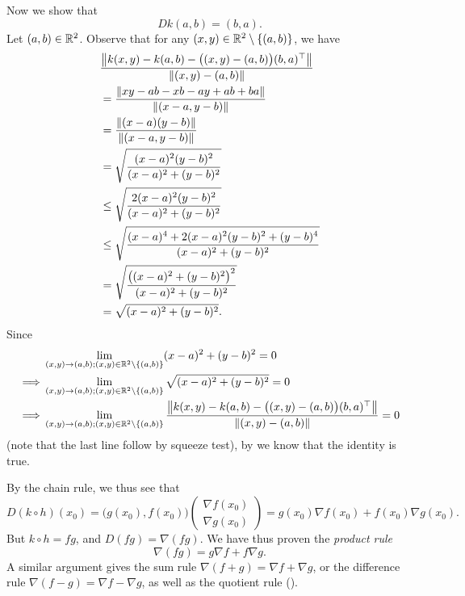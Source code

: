 \begin{eg}
  Now we show that
  \[
    D k(a, b) = (b, a).
  \]
  Let \((a, b) \in \R^2\).
  Observe that for any \((x, y) \in \R^2 \setminus \set{(a, b)}\), we have
  \begin{align*}
     & \dfrac{\norm*{k(x, y) - k(a, b) - \big((x, y) - (a, b)\big) (b, a)^\top}}{\norm*{(x, y) - (a, b)}} \\
     & = \dfrac{\norm*{xy - ab - xb - ay + ab + ba}}{\norm*{(x - a, y - b)}}                              \\
     & = \dfrac{\norm*{(x - a)(y - b)}}{\norm*{(x - a, y - b)}}                                           \\
     & = \sqrt{\dfrac{(x - a)^2 (y - b)^2}{(x - a)^2 + (y - b)^2}}                                        \\
     & \leq \sqrt{\dfrac{2 (x - a)^2 (y - b)^2}{(x - a)^2 + (y - b)^2}}                                   \\
     & \leq \sqrt{\dfrac{(x - a)^4 + 2 (x - a)^2 (y - b)^2 + (y - b)^4}{(x - a)^2 + (y - b)^2}}           \\
     & = \sqrt{\dfrac{\big((x - a)^2 + (y - b)^2\big)^2}{(x - a)^2 + (y - b)^2}}                          \\
     & = \sqrt{(x - a)^2 + (y - b)^2}.
  \end{align*}
  Since
  \begin{align*}
             & \lim_{(x, y) \to (a, b) ; (x, y) \in \R^2 \setminus \set{(a, b)}} (x - a)^2 + (y - b)^2 = 0                                                                              \\
    \implies & \lim_{(x, y) \to (a, b) ; (x, y) \in \R^2 \setminus \set{(a, b)}} \sqrt{(x - a)^2 + (y - b)^2} = 0                                                                       \\
    \implies & \lim_{(x, y) \to (a, b) ; (x, y) \in \R^2 \setminus \set{(a, b)}} \dfrac{\norm*{k(x, y) - k(a, b) - \big((x, y) - (a, b)\big) (b, a)^\top}}{\norm*{(x, y) - (a, b)}} = 0
  \end{align*}
  (note that the last line follow by squeeze test),
  by  we know that the identity is true.

  By the chain rule, we thus see that
  \[
    D (k \circ h)(x_0) = \big(g(x_0), f(x_0)\big) \begin{pmatrix}
      \nabla f(x_0) \\
      \nabla g(x_0)
    \end{pmatrix} = g(x_0) \nabla f(x_0) + f(x_0) \nabla g(x_0).
  \]
  But \(k \circ h = fg\), and \(D (fg) = \nabla (fg)\).
  We have thus proven the \emph{product rule}
  \[
    \nabla (fg) = g \nabla f + f \nabla g.
  \]
  A similar argument gives the sum rule \(\nabla (f + g) = \nabla f + \nabla g\), or the difference rule \(\nabla (f - g) = \nabla f - \nabla g\), as well as the quotient rule ().
\end{eg}

